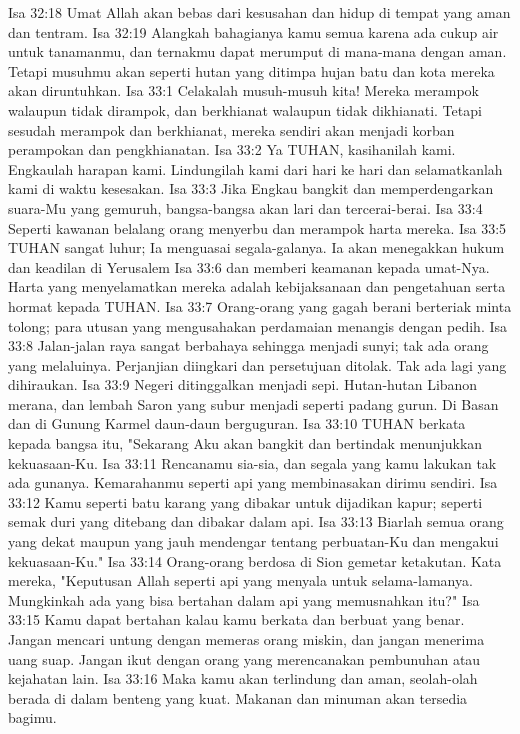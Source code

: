 Isa 32:18  Umat Allah akan bebas dari kesusahan dan hidup di tempat yang aman dan tentram.
Isa 32:19  Alangkah bahagianya kamu semua karena ada cukup air untuk tanamanmu, dan ternakmu dapat merumput di mana-mana dengan aman. Tetapi musuhmu akan seperti hutan yang ditimpa hujan batu dan kota mereka akan diruntuhkan.
Isa 33:1  Celakalah musuh-musuh kita! Mereka merampok walaupun tidak dirampok, dan berkhianat walaupun tidak dikhianati. Tetapi sesudah merampok dan berkhianat, mereka sendiri akan menjadi korban perampokan dan pengkhianatan.
Isa 33:2  Ya TUHAN, kasihanilah kami. Engkaulah harapan kami. Lindungilah kami dari hari ke hari dan selamatkanlah kami di waktu kesesakan.
Isa 33:3  Jika Engkau bangkit dan memperdengarkan suara-Mu yang gemuruh, bangsa-bangsa akan lari dan tercerai-berai.
Isa 33:4  Seperti kawanan belalang orang menyerbu dan merampok harta mereka.
Isa 33:5  TUHAN sangat luhur; Ia menguasai segala-galanya. Ia akan menegakkan hukum dan keadilan di Yerusalem
Isa 33:6  dan memberi keamanan kepada umat-Nya. Harta yang menyelamatkan mereka adalah kebijaksanaan dan pengetahuan serta hormat kepada TUHAN.
Isa 33:7  Orang-orang yang gagah berani berteriak minta tolong; para utusan yang mengusahakan perdamaian menangis dengan pedih.
Isa 33:8  Jalan-jalan raya sangat berbahaya sehingga menjadi sunyi; tak ada orang yang melaluinya. Perjanjian diingkari dan persetujuan ditolak. Tak ada lagi yang dihiraukan.
Isa 33:9  Negeri ditinggalkan menjadi sepi. Hutan-hutan Libanon merana, dan lembah Saron yang subur menjadi seperti padang gurun. Di Basan dan di Gunung Karmel daun-daun berguguran.
Isa 33:10  TUHAN berkata kepada bangsa itu, "Sekarang Aku akan bangkit dan bertindak menunjukkan kekuasaan-Ku.
Isa 33:11  Rencanamu sia-sia, dan segala yang kamu lakukan tak ada gunanya. Kemarahanmu seperti api yang membinasakan dirimu sendiri.
Isa 33:12  Kamu seperti batu karang yang dibakar untuk dijadikan kapur; seperti semak duri yang ditebang dan dibakar dalam api.
Isa 33:13  Biarlah semua orang yang dekat maupun yang jauh mendengar tentang perbuatan-Ku dan mengakui kekuasaan-Ku."
Isa 33:14  Orang-orang berdosa di Sion gemetar ketakutan. Kata mereka, "Keputusan Allah seperti api yang menyala untuk selama-lamanya. Mungkinkah ada yang bisa bertahan dalam api yang memusnahkan itu?"
Isa 33:15  Kamu dapat bertahan kalau kamu berkata dan berbuat yang benar. Jangan mencari untung dengan memeras orang miskin, dan jangan menerima uang suap. Jangan ikut dengan orang yang merencanakan pembunuhan atau kejahatan lain.
Isa 33:16  Maka kamu akan terlindung dan aman, seolah-olah berada di dalam benteng yang kuat. Makanan dan minuman akan tersedia bagimu.
